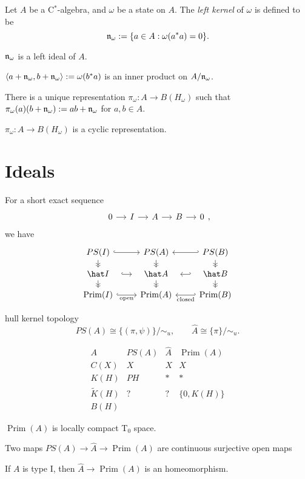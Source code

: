 \documentclass{../../large}
\newcommand{\Prim}{\operatorname{Prim}}
\begin{document}
\begin{prb}
Let $A$ be a C$^*$-algebra, and $\omega$ be a state on $A$.
The \emph{left kernel} of $\omega$ is defined to be
\[\mathfrak{n}_\omega:=\{a\in A:\omega(a^*a)=0\}.\]
\begin{parts}
\item $\mathfrak{n}_\omega$ is a left ideal of $A$.
\item $\langle a+\mathfrak{n}_\omega,b+\mathfrak{n}_\omega\rangle:=\omega(b^*a)$ is an inner product on $A/\mathfrak{n}_\omega$.
\item There is a unique representation $\pi_\omega:A\to B(H_\omega)$ such that $\pi_\omega(a)(b+\mathfrak{n}_\omega):=ab+\mathfrak{n}_\omega$ for $a,b\in A$.
\item $\pi_\omega:A\to B(H_\omega)$ is a cyclic representation.
\end{parts}
\end{prb}




\section{Ideals}

For a short exact sequence
\[\begin{tikzcd}[column sep=small]0\rar&I\rar&A\rar&B\rar&0\end{tikzcd},\]
we have
\[\begin{tikzcd}[row sep=small]
PS(I) \dar[->>]\rar[hook] & PS(A) \dar[->>] & PS(B) \dar[->>]\lar[hook'] \\
\hat I \dar[->>]\rar[hook,shorten >= 10, shorten <= 10] & \hat A \dar[->>] & \hat B \dar[->>]\lar[hook',shorten >= 10, shorten <= 10] \\
\Prim(I) \rar[hook,swap]{\text{open}} & \Prim(A) & \Prim(B) \lar[hook']{\text{closed}}
\end{tikzcd}\]




\begin{prb}
\end{prb}

\begin{prb}
hull kernel topology
\[PS(A)\cong\{(\pi,\psi)\}/\sim_u,\qquad\hat A\cong\{\pi\}/\sim_u.\]

\[\begin{array}{c|ccc}
A & PS(A) & \hat A & \Prim(A) \\\hline
C(X) & X & X & X \\
K(H) & PH & * & * \\
\tilde K(H) & ? & ? & \{0,K(H)\} \\
B(H) &&&
\end{array}\]
\begin{parts}
\item $\Prim(A)$ is locally compact T$_0$ space.
\item Two maps $PS(A)\to\hat A\to\Prim(A)$ are continuous surjective open maps
\item If $A$ is type I, then $\hat A\to\Prim(A)$ is an homeomorphism.
\end{parts}

\end{prb}
\end{document}
